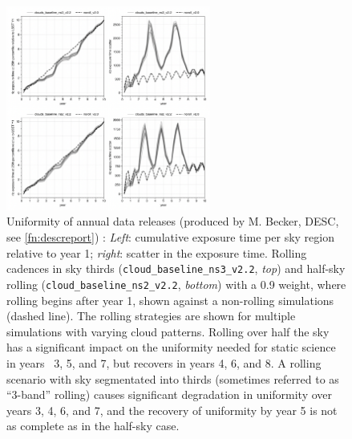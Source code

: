 \begin{enumerate}
 \begin{figure}
    \centering
    \includegraphics[width=0.6\textwidth]{figures/uniformity_DESC.png}
     
     \caption{Uniformity of annual data releases (produced by M. Becker, DESC, see \autoref{fn:descreport})
     : \emph{Left}: cumulative exposure time per sky region relative to year 1; \emph{right}: scatter in the exposure time.
     Rolling cadences in sky thirds (\texttt{cloud\_baseline\_ns3\_v2.2}, \emph{top}) and half-sky rolling (\texttt{cloud\_baseline\_ns2\_v2.2}, \emph{bottom}) with a 0.9 weight, where rolling begins after year 1, shown against a non-rolling simulations (dashed line). The rolling strategies are shown for multiple simulations with varying cloud patterns. Rolling over half the sky has a significant impact on the uniformity needed for static science in years ~3, 5, and 7, but recovers in years 4, 6, and 8. A rolling scenario with sky segmentated into thirds (sometimes referred to as ``3-band'' rolling) causes significant degradation in uniformity over years 3, 4, 6, and 7, and the recovery of uniformity by year 5 is not as complete as in the half-sky case. }
     \label{fig:rolluniformity}
 \end{figure}


\end{enumerate}
